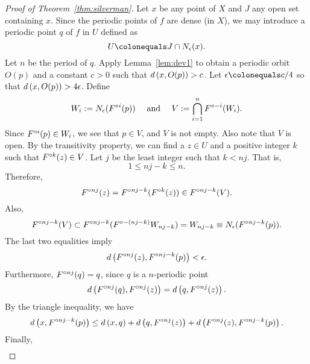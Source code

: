 \documentclass[12pt,draft,twoside]{book}
\begin{document}
\begin{proof}[Proof of Theorem~\ref{thm:silverman}]
  Let $x$ be any point of $X$ and $J$ any open set containing $x$.
  Since the periodic points of $f$ are dense (in $X$), we may introduce a periodic point
  $q$ of $f$ in $U$ defined as
  \begin{equation*}
    U \ceq J\cap \oball{\epsilon}{x}.
  \end{equation*}
  Let $n$ be the period of $q$.
  Apply Lemma~\ref{lem:dev1} to obtain a periodic orbit $O(p)$ and a constant $c > 0$ such that $d\left( x, O(p) \right) > c$.
  Let $\epsilon \ceq c/4$ so that $d\left( x, O(p) \right) > 4\epsilon$.
  Define
  \begin{equation*}
    W_i := N_{\epsilon}(F^{\circ i}(p)) \quad\text{ and }\quad V := \bigcap\limits_{i = 1}^{n} F^{\circ -i}(W_i).
  \end{equation*}
  Since $F^{\circ i}(p) \in W_i$, we see that $p \in V$, and $V$ is not empty. 
  Also note that $V$ is open.
  By the transitivity property, we can find a $z\in U$ and a positive integer $k$ such that
  $F^{\circ k}(z) \in V$. Let $j$ be the least integer such that $k < nj$. 
  That is,
  \begin{equation*}
    1 \leq nj - k \leq n.
  \end{equation*}
  Therefore,
  \begin{equation*}
    F^{\circ nj} (z) = F^{\circ nj - k} (F^{\circ k}(z)) \in F^{\circ nj-k}(V).
  \end{equation*}
  Also,
  \begin{equation*}
    F^{\circ nj - k}(V) \subset F^{\circ nj - k}(F^{\circ -(nj - k)} W_{nj-k}) 
    = W_{nj-k}
    \equiv N_{\epsilon}(F^{\circ nj-k}(p)).
  \end{equation*}
  The last two equalities imply
  \begin{equation*}
    d\left( F^{\circ nj}(z), F^{\circ nj - k}(p) \right) < \epsilon.
  \end{equation*}
  Furthermore, $F^{\circ nj}(q) = q$, since $q$ is a $n$-periodic point 
  \begin{equation*}
    d\left( F^{\circ nj}(q), F^{\circ nj}(z) \right) = d\left( q, F^{\circ nj}(z) \right).
  \end{equation*}
  By the triangle inequality, we have
  \begin{equation*}
    d\left( x, F^{\circ nj-k}(p) \right) \leq d\left( x,q \right) + d\left( q, F^{\circ nj}(z) \right) + d\left( F^{\circ nj}(z), F^{\circ nj - k}(p) \right).
  \end{equation*}
  Finally, 
  \begin{align*}

\end{align*}
\end{proof}
\end{document}

